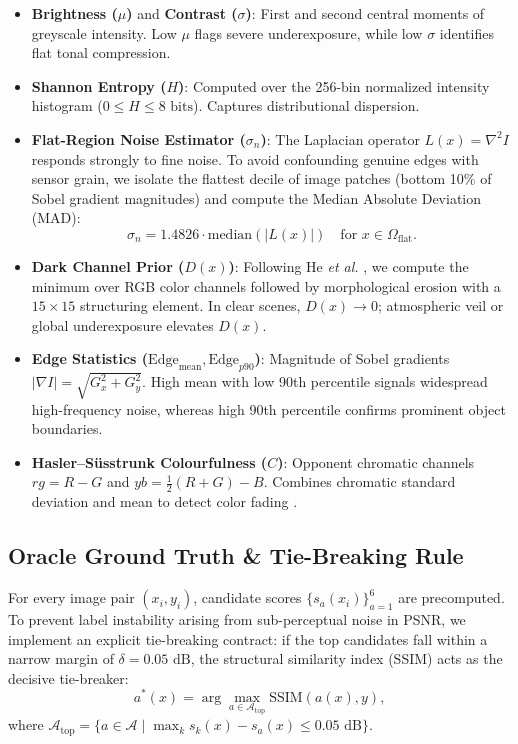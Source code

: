 \documentclass[journal]{IEEEtran}
\begin{document}
\begin{itemize}
    \item \textbf{Brightness ($\mu$)} and \textbf{Contrast ($\sigma$)}: First and second central moments of greyscale intensity. Low $\mu$ flags severe underexposure, while low $\sigma$ identifies flat tonal compression.
    \item \textbf{Shannon Entropy ($H$)}: Computed over the 256-bin normalized intensity histogram ($0 \le H \le 8\text{ bits}$). Captures distributional dispersion.
    \item \textbf{Flat-Region Noise Estimator ($\sigma_n$)}: The Laplacian operator $L(x) = \nabla^2 I$ responds strongly to fine noise. To avoid confounding genuine edges with sensor grain, we isolate the flattest decile of image patches (bottom 10\% of Sobel gradient magnitudes) and compute the Median Absolute Deviation (MAD):
    \begin{equation}
    \sigma_n = 1.4826 \cdot \text{median}\left( \left| L(x) \right| \right) \quad \text{for } x \in \Omega_{\text{flat}}.
    \end{equation}
    \item \textbf{Dark Channel Prior ($D(x)$)}: Following He \textit{et al.} \cite{he2011single}, we compute the minimum over RGB color channels followed by morphological erosion with a $15 \times 15$ structuring element. In clear scenes, $D(x) \to 0$; atmospheric veil or global underexposure elevates $D(x)$.
    \item \textbf{Edge Statistics ($\text{Edge}_{\text{mean}}, \text{Edge}_{p90}$)}: Magnitude of Sobel gradients $|\nabla I| = \sqrt{G_x^2 + G_y^2}$. High mean with low 90th percentile signals widespread high-frequency noise, whereas high 90th percentile confirms prominent object boundaries.
    \item \textbf{Hasler--Süsstrunk Colourfulness ($C$)}: Opponent chromatic channels $rg = R - G$ and $yb = \frac{1}{2}(R + G) - B$. Combines chromatic standard deviation and mean to detect color fading \cite{hasler2003measuring}.
\end{itemize}

\subsection{Oracle Ground Truth \& Tie-Breaking Rule}
For every image pair $(x_i, y_i)$, candidate scores $\{s_a(x_i)\}_{a=1}^6$ are precomputed. To prevent label instability arising from sub-perceptual noise in PSNR, we implement an explicit tie-breaking contract: if the top candidates fall within a narrow margin of $\delta = 0.05\text{ dB}$, the structural similarity index (SSIM) acts as the decisive tie-breaker:
\begin{equation}
a^*(x) = \arg\max_{a \in \mathcal{A}_{\text{top}}} \text{SSIM}(a(x), y),
\end{equation}
where $\mathcal{A}_{\text{top}} = \{a \in \mathcal{A} \mid \max_k s_k(x) - s_a(x) \le 0.05\text{ dB}\}$.
\end{document}
